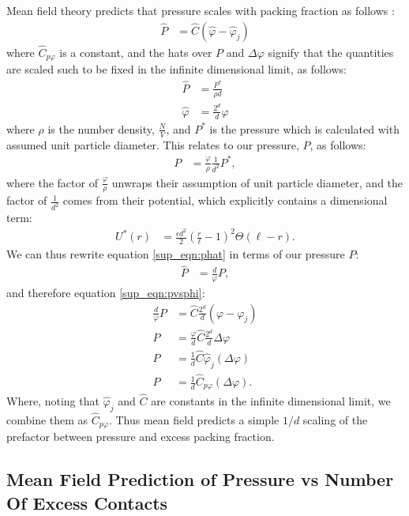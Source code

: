 Mean field theory predicts that pressure scales with packing fraction as follows \cite{parisi_theory_2020}:
\begin{align}
 \hat{P} &= \hat{C}(\hat{\varphi} - \hat{\varphi}_j) \label{sup_eqn:pvsphi}
 \end{align}
 where $\hat{C}_{p\varphi}$ is a constant, and the hats over $P$ and $\Delta \varphi$ signify that the quantities are scaled such to be fixed in the infinite dimensional limit, as follows:
 \begin{align}
\hat{P} &= \frac{P^*}{\rho d} \label{sup_eqn:phat} \\
\hat{\varphi} &= \frac{2^d}{d} \varphi %
 \end{align}
where $\rho$ is the number density, $\frac{N}{V}$, and $P^*$ is the pressure which is calculated with assumed unit particle diameter. This relates to our pressure, $P$, as follows:
\begin{align}
 P & = \frac{\varphi}{\rho} \frac{1}{d^2} P^* \label{sup_eqn:pstar} , 
\end{align}
where the factor of $\frac{\varphi}{\rho}$ unwraps their assumption of unit particle diameter, and the factor of $\frac{1}{d^2}$ comes from their potential, which explicitly contains a dimensional term:
\begin{align}
 U^*(r) &= \frac{\epsilon d^2}{2} \left(\frac{r}{\ell}-1\right)^2 \Theta\left(\ell-r\right).
\end{align}
We can thus rewrite equation \ref{sup_eqn:phat} in terms of our pressure $P$:
\begin{align}
 \hat{P} &= \frac{d}{\varphi}P,
\end{align}
 and therefore equation \ref{sup_eqn:pvsphi}:
 \begin{align}
  \frac{d}{\varphi}P &=\hat{C}\frac{2^d}{d}( \varphi - \varphi_j) \\
  P &= \frac{\varphi}{d} \hat{C} \frac{2^d}{d} \Delta \varphi \\
  P &= \frac{1}{d}\hat{C}\hat{\varphi}_j( \Delta \varphi) \\
   P &= \frac{1}{d}\hat{C}_{p\varphi}( \Delta \varphi). \label{sup_eqn:finalpvsphi}
\end{align}
%
Where, noting that $\hat{\varphi}_j$ and $\hat{C}$ are constants in the infinite dimensional limit, we combine them as $\hat{C}_{p\varphi}$. Thus mean field predicts a simple $1/d$ scaling of the prefactor between pressure and excess packing fraction.


\subsection{Mean Field Prediction of Pressure vs Number Of Excess Contacts}

